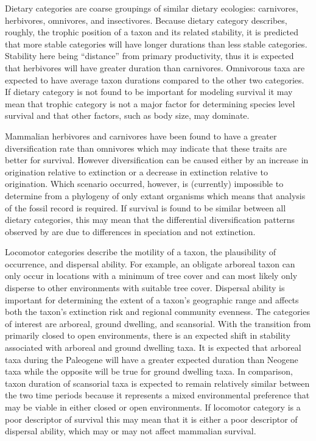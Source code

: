 \documentclass[11pt,letterpaper]{article}
\begin{document}
Dietary categories are coarse groupings of similar dietary ecologies: carnivores, herbivores, omnivores, and insectivores. Because dietary category describes, roughly, the trophic position of a taxon and its related stability, it is predicted that more stable categories will have longer durations than less stable categories. Stability here being ``distance'' from primary productivity, thus it is expected that herbivores will have greater duration than carnivores. Omnivorous taxa are expected to have average taxon durations compared to the other two categories. If dietary category is not found to be important for modeling survival it may mean that trophic category is not a major factor for determining species level survival and that other factors, such as body size, may dominate.

Mammalian herbivores and carnivores have been found to have a greater diversification rate than omnivores \citep{Price2012} which may indicate that these traits are better for survival. However diversification can be caused either by an increase in origination relative to extinction or a decrease in extinction relative to origination. Which scenario occurred, however, is (currently) impossible to determine from a phylogeny of only extant organisms \citep{Rabosky2010a} which means that analysis of the fossil record is required. If survival is found to be similar between all dietary categories, this may mean that the differential diversification patterns observed by \citet{Price2012} are due to differences in speciation and not extinction.

Locomotor categories describe the motility of a taxon, the plausibility of occurrence, and dispersal ability. For example, an obligate arboreal taxon can only occur in locations with a minimum of tree cover and can most likely only disperse to other environments with suitable tree cover. Dispersal ability is important for determining the extent of a taxon's geographic range \citep{Birand2012,Jablonski2006a,Gaston2009} and affects both the taxon's extinction risk and regional community evenness. The categories of interest are arboreal, ground dwelling, and scansorial. With the transition from primarily closed to open environments, there is an expected shift in stability associated with arboreal and ground dwelling taxa. It is expected that arboreal taxa during the Paleogene will have a greater expected duration than Neogene taxa while the opposite will be true for ground dwelling taxa. In comparison, taxon duration of scansorial taxa is expected to remain relatively similar between the two time periods because it represents a mixed environmental preference that may be viable in either closed or open environments. If locomotor category is a poor descriptor of survival this may mean that it is either a poor descriptor of dispersal ability, which may or may not affect mammalian survival. 
\end{document}
